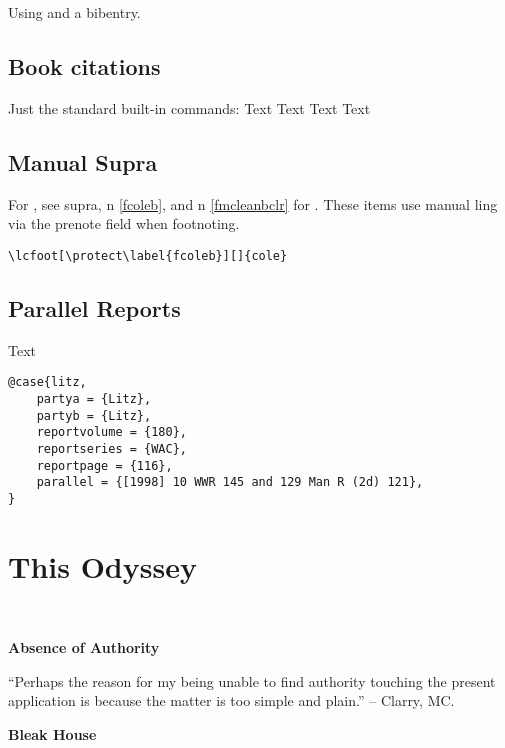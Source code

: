 \bigskip
Using  and a bibentry.
\subsection{Book citations}
Just the standard built-in commands: Text\autocite[110]{eco} Text\autocite[42]{buttb} Text\autocite[para ]{anncrimnsw} Text\autocite[\nopp c 1]{bishop} %

\subsection{Manual Supra}
For , see supra, n \ref{fcoleb}, and n \ref{fmcleanbclr} for . These items use manual ling via the prenote field when footnoting.

\begin{verbatim}
\lcfoot[\protect\label{fcoleb}][]{cole}
\end{verbatim}

%
\bigskip 


\subsection{Parallel Reports}

Text
\begin{verbatim}
@case{litz,
	partya = {Litz},
	partyb = {Litz},
	reportvolume = {180},
	reportseries = {WAC},
	reportpage = {116},
	parallel = {[1998] 10 WWR 145 and 129 Man R (2d) 121},
}
\end{verbatim}







\section{This Odyssey}
\ 

\textbf{Absence of Authority}

``Perhaps the reason for my being unable to find authority touching the present application is because the matter is too simple and plain.'' -- Clarry, MC.
\bigskip

\textbf{Bleak House}

